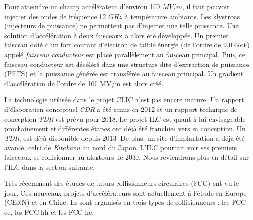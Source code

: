   \medskip
  
  Pour atteindre un champ acc\'el\'erateur d'environ 100 $MV/m$, il faut pouvoir injecter des ondes de fr\'equence 12 $GHz$ \`a temp\'erature ambiante. Les klystrons (injecteurs de puissance) ne permettent pas d'injecter une telle puissance. Une solution d'acc\'el\'eration \`a deux faisceaux a alors \'et\'e d\'evelopp\'ee. Un premier faisceau dot\'e d'un fort courant d'\'electron de faible \'energie (de l'ordre de 9.0 $GeV$) appel\'e \textit{faisceau conducteur} est plac\'e parall\`element au faisceau principal. Puis, ce faisceau conducteur est d\'ec\'el\'er\'e dans une structure dite d'extraction de puissance (PETS) et la puissance g\'en\'er\'ee est transf\'er\'ee au faisceau principal. Un gradient d'acc\'el\'eration de l'ordre de 100 MV/m est alors cr\'e\'e.
  
  \medskip
  
  La technologie utilis\'ee dans le projet CLIC n'est pas encore mature. Un rapport d'\'elaboration conceptuel \textit{CDR} a \'et\'e remis en 2012 et un rapport technique de conception \textit{TDR} est pr\'evu pour 2018. Le projet ILC est quant \`a lui envisageable prochainement et diff\'erentes \'etapes ont d\'ej\`a été franchies vers sa conception. Un \textit{TDR}, est d\'ej\`a disponible depuis 2013. De plus, un site d'implantation a déjà \'et\'e avanc\'e, celui de \textit{Kitakami} au nord du Japon. L'ILC pourrait voir ses premiers faisceaux se collisionner au alentours de 2030. Nous reviendrons plus en d\'etail sur l'ILC dans la section suivante.
  
  \medskip
  
  Tr\`es récemment des \'etudes de futurs collisionneurs circulaires (FCC) ont vu le jour. Ces nouveaux projets d'acc\'el\'erateurs sont actuellement \`a l'\'etude en Europe (CERN) et en Chine.  Ils sont organis\'es en trois types de collisionneurs : les FCC-ee, les FCC-hh et les FCC-he.
  
  \medskip
  
